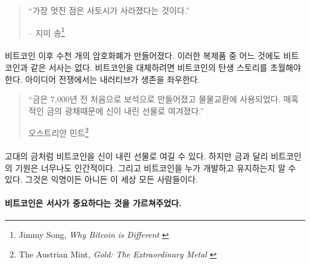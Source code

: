 \begin{quotation}\begin{samepage}
		\enquote{가장 멋진 점은 사토시가 사라졌다는 것이다.}
		\begin{flushright} -- 지미 송\footnote{Jimmy Song, \textit{Why Bitcoin is Different} \cite{bitcoin-different}}
\end{flushright}\end{samepage}\end{quotation}

\newpage

\paragraph{}
비트코인 이후 수천 개의 암호화폐가 만들어졌다. 
이러한 복제품 중 어느 것에도 비트코인과 같은 서사는 없다.
비트코인을 대체하려면 비트코인의 탄생 스토리를 초월해야 한다. 
아이디어 전쟁에서는 내러티브가 생존을 좌우한다.

\begin{quotation}\begin{samepage}
		\enquote{금은 7,000년 전 처음으로 보석으로 만들어졌고 물물교환에 사용되었다. 매혹적인 금의 광채때문에 신이 내린 선물로 여겨졌다.}
		\begin{flushright} 오스트리안 민트\footnote{The Austrian Mint, \textit{Gold: The Extraordinary Metal} \cite{gold-gift-gods}}
\end{flushright}\end{samepage}\end{quotation}

\paragraph{}
고대의 금처럼 비트코인을 신이 내린 선물로 여길 수 있다. 
하지만 금과 달리 비트코인의 기원은 너무나도 인간적이다. 
그리고 비트코인을 누가 개발하고 유지하는지 알 수 있다.
그것은 익명이든 아니든 이 세상 모든 사람들이다.

\paragraph{비트코인은 서사가 중요하다는 것을 가르쳐주었다.}

%
%
%
%
